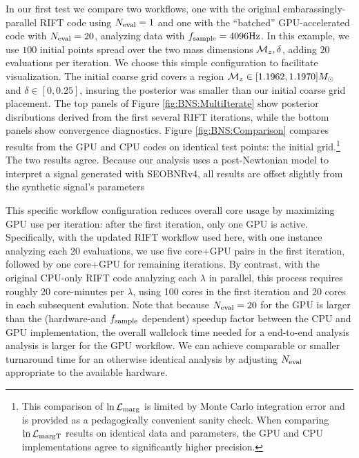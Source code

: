 \documentclass[twocolumn,prd,nofootinbib]{revtex4}
\newcommand\unit[1]{{\rm #1}}
\newcommand\editremark[1]{{\color{red} #1}}
\newcommand{\mc}{{\cal M}}
\begin{document}
\begin{figure*}
\caption{\label{fig:BNS:Comparison}\textbf{Comparison of GPU, CPU analysis}: \editremark{worthwhile}
}
\end{figure*}



% 
In our first test we compare two workflows, one with the original embarassingly-parallel RIFT code using $N_{\rm
  eval}=1$ and one with the
``batched'' GPU-accelerated code with $N_{\rm eval}=20$, analyzing data with $f_{\rm sample}=4096\unit{Hz}$.    
In this example, we use $100$ initial points spread over the two mass dimensions $\mc_z,\delta$, adding $20$ evaluations per
iteration.   We
choose this simple configuration to facilitate visualization.     The initial coarse grid covers a region $\mc_z\in[1.1962,1.1970] M_\odot$ and $\delta \in [0,0.25]$,  insuring the posterior was smaller than our initial
coarse grid placement.     The top  panels of Figure  \ref{fig:BNS:MultiIterate} show posterior disributions derived
from the first several RIFT iterations, while the bottom panels show convergence diagnostics.
Figure \ref{fig:BNS:Comparison} compares results from the GPU and CPU codes on \editremark{identical test points: the
  initial grid}.\footnote{This comparison of $\ln {\cal L}_{\rm marg}$ is limited by Monte Carlo integration error and
  is provided  as a pedagogically convenient sanity check.  When comparing 
  $\ln {\cal L}_{\rm margT}$ results on identical data and parameters, the GPU and CPU implementations agree to
  significantly higher precision.}  The two results agree.
Because our analysis uses a post-Newtonian model to interpret a signal generated with SEOBNRv4, all results are offset
slightly from the synthetic signal's parameters


This specific workflow configuration  reduces overall core usage by maximizing GPU use per iteration: after the first
iteration, only one GPU is active.   
Specifically,  with the updated RIFT workflow used here, with one instance analyzing each 20 evaluations,  we use five
core+GPU pairs in the
first iteration, followed by one core+GPU for remaining iterations.
By contrast, with the original CPU-only RIFT code analyzing each $\lambda$ in parallel, this process requires roughly 20 core-minutes
per $\lambda$, using 100 cores in the first iteration and 20 cores in each
subsequent evalution.   
Note that  because   $N_{\rm eval}=20$ for the GPU is larger than the (hardware-and $f_{\rm sample}$ dependent)  speedup factor between the CPU and
GPU implementation, the overall wallclock time needed for a end-to-end
analysis analysis is larger for the GPU workflow.
We can achieve comparable or smaller turnaround time for an otherwise identical analysis by adjusting $N_{\rm eval}$ appropriate to the available hardware.
\end{document}

